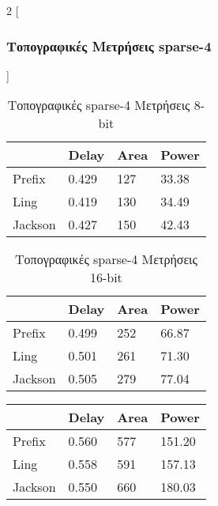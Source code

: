 \begin{multicols}{2}
[\subsubsection{Τοπογραφικές Μετρήσεις sparse-4}]

\begin{table}[H]
\centering
     \begin{tabular}{||p{1.2cm} | p{0.7cm} p{1cm} p{1cm} ||} 
        \hline
         & Delay & Area & Power \\ [0.5ex]
        \hline\hline
        Prefix & 0.429 & 127 & 33.38 \\
        \hline
        Ling & 0.419 & 130 & 34.49 \\
        \hline
        Jackson & 0.427 & 150 & 42.43 \\
        \hline
    \end{tabular}
\caption{Τοπογραφικές sparse-4 Μετρήσεις 8-bit}
\label{topo_sparse4_result_table_8}
\end{table}
\begin{table}[H]
\centering
     \begin{tabular}{||p{1.2cm} | p{0.7cm} p{1cm} p{1cm} ||} 
        \hline
         & Delay & Area & Power \\ [0.5ex] 
        \hline\hline
        Prefix & 0.499 & 252 & 66.87 \\
        \hline
        Ling & 0.501 & 261 & 71.30 \\
        \hline
        Jackson & 0.505 & 279 & 77.04 \\
        \hline
    \end{tabular}
\caption{Τοπογραφικές sparse-4 Μετρήσεις 16-bit}
\label{topo_sparse4_result_table_16}
\end{table}
\begin{table}[H]
\centering
     \begin{tabular}{||p{1.2cm} | p{0.7cm} p{1cm} p{1cm} ||} 
        \hline
         & Delay & Area & Power \\ [0.5ex]
        \hline\hline
        Prefix & 0.560 & 577 & 151.20 \\
        \hline
        Ling & 0.558 & 591 & 157.13 \\
        \hline
        Jackson & 0.550 & 660 & 180.03 \\
        \hline
    \end{tabular}

\end{table}
\end{multicols}
